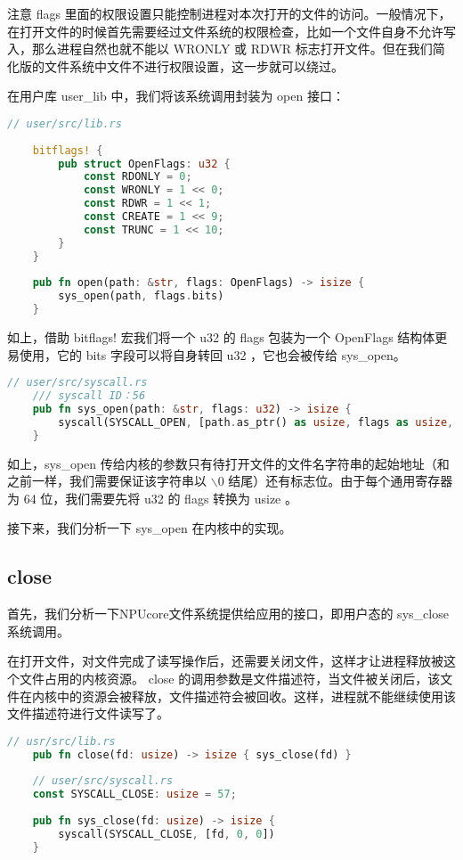 注意 flags 里面的权限设置只能控制进程对本次打开的文件的访问。一般情况下，在打开文件的时候首先需要经过文件系统的权限检查，比如一个文件自身不允许写入，那么进程自然也就不能以 WRONLY 或 RDWR 标志打开文件。但在我们简化版的文件系统中文件不进行权限设置，这一步就可以绕过。

在用户库 user_lib 中，我们将该系统调用封装为 open 接口：
\begin{lstlisting}[language=rust]
	// user/src/lib.rs
	
	bitflags! {
		pub struct OpenFlags: u32 {
			const RDONLY = 0;
			const WRONLY = 1 << 0;
			const RDWR = 1 << 1;
			const CREATE = 1 << 9;
			const TRUNC = 1 << 10;
		}
	}
	
	pub fn open(path: &str, flags: OpenFlags) -> isize {
		sys_open(path, flags.bits)
	}
\end{lstlisting}

如上，借助 bitflags! 宏我们将一个 u32 的 flags 包装为一个 OpenFlags 结构体更易使用，它的 bits 字段可以将自身转回 u32 ，它也会被传给 sys_open。
\begin{lstlisting}[language=rust]
	// user/src/syscall.rs
	/// syscall ID：56
	pub fn sys_open(path: &str, flags: u32) -> isize {
		syscall(SYSCALL_OPEN, [path.as_ptr() as usize, flags as usize, 0])
	}
\end{lstlisting}

如上，sys_open 传给内核的参数只有待打开文件的文件名字符串的起始地址（和之前一样，我们需要保证该字符串以 $\backslash$0 结尾）还有标志位。由于每个通用寄存器为 64 位，我们需要先将 u32 的 flags 转换为 usize 。

接下来，我们分析一下 sys_open 在内核中的实现。


\subsection{close}
首先，我们分析一下NPUcore文件系统提供给应用的接口，即用户态的 sys_close 系统调用。

在打开文件，对文件完成了读写操作后，还需要关闭文件，这样才让进程释放被这个文件占用的内核资源。 close 的调用参数是文件描述符，当文件被关闭后，该文件在内核中的资源会被释放，文件描述符会被回收。这样，进程就不能继续使用该文件描述符进行文件读写了。
\begin{lstlisting}[language=rust]
	// usr/src/lib.rs
	pub fn close(fd: usize) -> isize { sys_close(fd) }
	
	// user/src/syscall.rs
	const SYSCALL_CLOSE: usize = 57;
	
	pub fn sys_close(fd: usize) -> isize {
		syscall(SYSCALL_CLOSE, [fd, 0, 0])
	}
\end{lstlisting}

